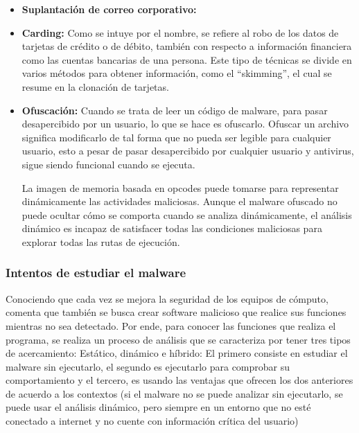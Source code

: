 \begin{itemize}
  \item \textbf{Suplantación de correo corporativo:}

  \item \textbf{Carding:}
    Como se intuye por el nombre, se refiere al robo de los datos de tarjetas de
    crédito o de débito, también con respecto a información financiera como las
    cuentas bancarias de una persona. Este tipo de técnicas se divide en varios
    métodos para obtener información, como el ``skimming'', el cual se resume en
    la clonación de tarjetas. \parencite{Mosquera2019}

  \item \textbf{Ofuscación:}
    Cuando se trata de leer un código de malware, para pasar desapercibido por
    un usuario, lo que se hace es ofuscarlo. Ofuscar un archivo significa
    modificarlo de tal forma que no pueda ser legible para cualquier usuario,
    esto a pesar de pasar desapercibido por cualquier usuario y antivirus, sigue
    siendo funcional cuando se ejecuta.
    \begin{displayquote}
      La imagen de memoria basada en opcodes puede tomarse para representar
      dinámicamente las actividades maliciosas. Aunque el malware ofuscado no
      puede ocultar cómo se comporta cuando se analiza dinámicamente, el
      análisis dinámico es incapaz de satisfacer todas las condiciones
      maliciosas para explorar todas las rutas de ejecución.
      \parencite{Aboaoja2022}
    \end{displayquote}
\end{itemize}

\subsubsection{Intentos de estudiar el malware}

Conociendo que cada vez se mejora la seguridad de los equipos de cómputo,
\textcite{Aboaoja2022} comenta que también se busca crear software malicioso que
realice sus funciones mientras no sea detectado. Por ende, para conocer las
funciones que realiza el programa, se realiza un proceso de análisis que se
caracteriza por tener tres tipos de acercamiento: Estático, dinámico e híbrido:
El primero consiste en estudiar el malware sin ejecutarlo, el segundo es
ejecutarlo para comprobar su comportamiento y el tercero, es usando las ventajas
que ofrecen los dos anteriores de acuerdo a los contextos (si el malware no
se puede analizar sin ejecutarlo, se puede usar el análisis dinámico, pero
siempre en un entorno que no esté conectado a internet y no cuente con
información crítica del usuario)

